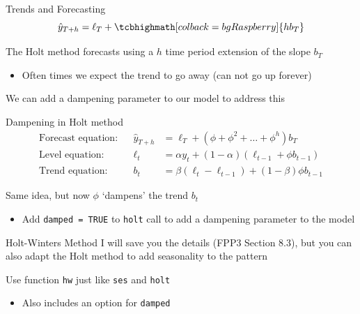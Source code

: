 \documentclass[aspectratio=169,t,11pt,table]{beamer}
\begin{document}
\begin{frame}{Trends and Forecasting}
  \vspace*{-\bigskipamount}
  $$
    \hat{y}_{T+h} = \ell_{T} + \tcbhighmath[colback = bgRaspberry]{h b_{T}}
  $$
  
  The Holt method forecasts using a $h$ time period extension of the slope $b_T$
  \begin{itemize}
    \item Often times we expect the trend to go away (can not go up forever)
  \end{itemize}

  \bigskip
  We can add a \alert{dampening} parameter to our model to address this
\end{frame}

\begin{frame}{Dampening in Holt method}
  \begin{align*}
    \text{Forecast equation:} && \hat{y}_{T+h} &= \ell_{T} + (\phi+\phi^2 + \dots + \phi^{h}) b_{T} \\[2mm]
    \text{Level equation:}    && \ell_{t} &= \alpha y_{t} + (1 - \alpha)(\ell_{t-1} + \phi b_{t-1}) \\[2mm]
    \text{Trend equation:}    && b_{t}    &= \beta(\ell_{t} - \ell_{t-1}) + (1 -\beta) \phi b_{t-1}
  \end{align*}

  \bigskip
  Same idea, but now $\phi$ `dampens' the trend $b_t$
  \begin{itemize}
    \item Add \texttt{damped = TRUE} to \texttt{holt} call to add a dampening parameter to the model
  \end{itemize}
\end{frame}



\begin{frame}{Holt-Winters Method}
  I will save you the details (FPP3 Section 8.3), but you can also adapt the Holt method to add seasonality to the pattern 

  \bigskip
  Use function \texttt{hw} just like \texttt{ses} and \texttt{holt}
  \begin{itemize}
    \item Also includes an option for \texttt{damped}
  \end{itemize}
\end{frame}
\end{document}
